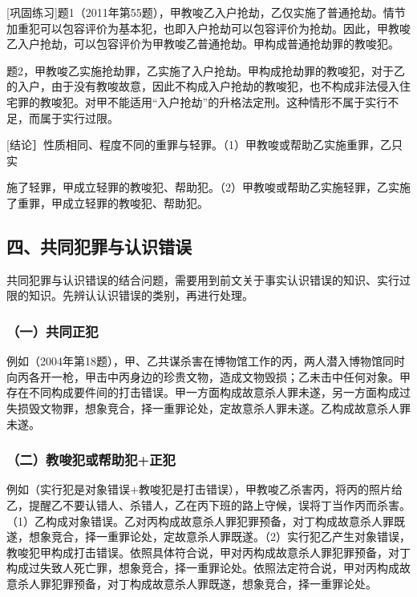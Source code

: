 [巩固练习]题1（2011年第55题），甲教唆乙入户抢劫，乙仅实施了普通抢劫。情节加重犯可以包容评价为基本犯，也即入户抢劫可以包容评价为抢劫。因此，甲教唆乙入户抢劫，可以包容评价为甲教唆乙普通抢劫。甲构成普通抢劫罪的教唆犯。

题2，甲教唆乙实施抢劫罪，乙实施了入户抢劫。甲构成抢劫罪的教唆犯，对于乙的入户，由于没有教唆故意，因此不构成入户抢劫的教唆犯，也不构成非法侵入住宅罪的教唆犯。对甲不能适用“入户抢劫”的升格法定刑。这种情形不属于实行不足，而属于实行过限。

[结论］性质相同、程度不同的重罪与轻罪。（1）甲教唆或帮助乙实施重罪，乙只实

施了轻罪，甲成立轻罪的教唆犯、帮助犯。（2）甲教唆或帮助乙实施轻罪，乙实施了重罪，甲成立轻罪的教唆犯、帮助犯。

\subsection*{四、共同犯罪与认识错误}

共同犯罪与认识错误的结合问题，需要用到前文关于事实认识错误的知识、实行过限的知识。先辨认认识错误的类别，再进行处理。

\subsubsection*{（一）共同正犯}

例如（2004年第18题），甲、乙共谋杀害在博物馆工作的丙，两人潜入博物馆同时向丙各开一枪，甲击中丙身边的珍贵文物，造成文物毁损；乙未击中任何对象。甲存在不同构成要件间的打击错误。甲一方面构成故意杀人罪未遂，另一方面构成过失损毁文物罪，想象竞合，择一重罪论处，定故意杀人罪未遂。乙构成故意杀人罪未遂。

\subsubsection*{（二）教唆犯或帮助犯+正犯}

例如（实行犯是对象错误+教唆犯是打击错误），甲教唆乙杀害丙，将丙的照片给乙，提醒乙不要认错人、杀错人，乙在丙下班的路上守候，误将丁当作丙而杀害。（1）乙构成对象错误。乙对丙构成故意杀人罪犯罪预备，对丁构成故意杀人罪既遂，想象竞合，择一重罪论处，定故意杀人罪既遂。（2）实行犯乙产生对象错误，教唆犯甲构成打击错误。依照具体符合说，甲对丙构成故意杀人罪犯罪预备，对丁构成过失致人死亡罪，想象竞合，择一重罪论处。依照法定符合说，甲对丙构成故意杀人罪犯罪预备，对丁构成故意杀人罪既遂，想象竞合，择一重罪论处。

